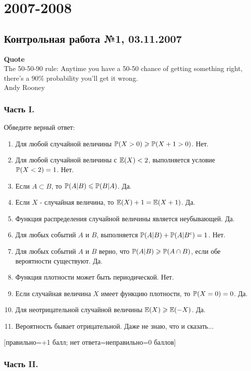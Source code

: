 \documentclass[12pt, a4paper]{article}\usepackage[]{graphicx}\usepackage[]{color}
\begin{document}
\section{2007-2008}


\subsection{Контрольная работа №1, 03.11.2007}

\textbf{Quote}\\
The 50-50-90 rule: Anytime you have a 50-50 chance of getting something right, there's a 90\% probability you'll get it wrong. \\
Andy Rooney\\

\subsubsection*{Часть I.}

Обведите верный ответ:

\begin{enumerate}
\item Для любой случайной величины $\P(X>0)\ge \P(X+1>0)$. Нет.
\item Для любой случайной величины с $\E(X)<2$, выполняется условие $\P(X<2)=1$. Нет.
\item Если $A\subset B$, то $\P(A|B)\le \P(B|A)$. Да.
\item Если  $X$  - случайная величина, то $\E(X)+1=\E(X+1)$. Да.
\item Функция распределения случайной величины является неубывающей. Да.
\item Для любых событий $A$ и $B$, выполняется $\P(A|B)+\P(A|B^{c})=1$. Нет.
\item Для любых событий  $A$  и  $B$  верно, что $\P(A|B)\ge \P(A\cap
B)$, если обе вероятности существуют. Да.
\item Функция плотности может быть периодической. Нет.
\item Если случайная величина $X$ имеет функцию плотности, то $\P(X=0)=0$. Да.
\item Для неотрицательной случайной величины $\E(X)\ge \E(-X)$. Да.
\item Вероятность бывает отрицательной. Даже не знаю, что и сказать...
\end{enumerate}

$[$правильно=+1 балл; нет ответа=неправильно=0 баллов$]$

\subsubsection*{Часть II.}
\end{document}
